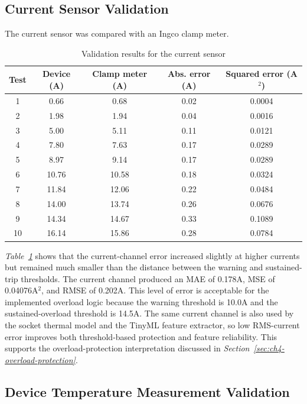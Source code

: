 \subsection{Current Sensor Validation}
\label{sec:ch4-current-validation}

The current sensor was compared with an Ingco clamp meter.

\begin{table}[H]
  \centering
  \caption{Validation results for the current sensor}
  \label{tab:ch4-current-validation}
  \begin{tabular}{ccccc}
    \toprule
    \textbf{Test} & \textbf{Device (A)} & \textbf{Clamp meter (A)} & \textbf{Abs. error (A)} & \textbf{Squared error (A$^2$)} \\
    \midrule
    1 & 0.66 & 0.68 & 0.02 & 0.0004 \\
    2 & 1.98 & 1.94 & 0.04 & 0.0016 \\
    3 & 5.00 & 5.11 & 0.11 & 0.0121 \\
    4 & 7.80 & 7.63 & 0.17 & 0.0289 \\
    5 & 8.97 & 9.14 & 0.17 & 0.0289 \\
    6 & 10.76 & 10.58 & 0.18 & 0.0324 \\
    7 & 11.84 & 12.06 & 0.22 & 0.0484 \\
    8 & 14.00 & 13.74 & 0.26 & 0.0676 \\
    9 & 14.34 & 14.67 & 0.33 & 0.1089 \\
    10 & 16.14 & 15.86 & 0.28 & 0.0784 \\
    \bottomrule
  \end{tabular}
\end{table}

\textit{Table~\ref{tab:ch4-current-validation}} shows that the current-channel
error increased slightly at higher currents but remained much smaller than the
distance between the warning and sustained-trip thresholds. The current channel
produced an MAE of 0.178A, MSE of 0.04076A$^2$, and RMSE of 0.202A. This level
of error is acceptable for the implemented overload logic because the warning
threshold is 10.0A and the sustained-overload threshold is 14.5A. The same
current channel is also used by the socket thermal model and the TinyML feature
extractor, so low RMS-current error improves both threshold-based protection
and feature reliability. This supports the overload-protection interpretation
discussed in \textit{Section~\ref{sec:ch4-overload-protection}}.

\subsection{Device Temperature Measurement Validation}
\label{sec:ch4-temperature-validation}

